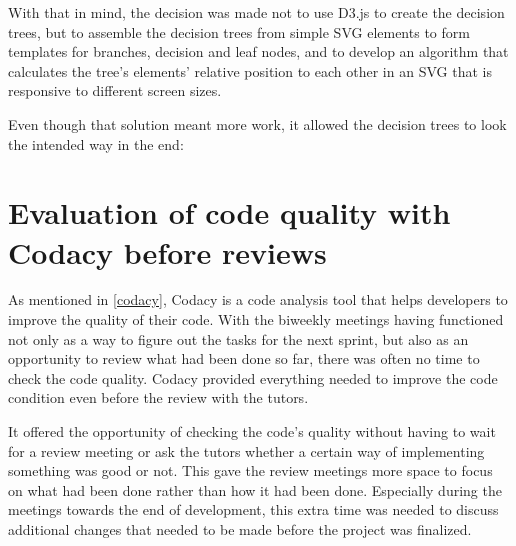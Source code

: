 With that in mind, the decision was made not to use D3.js to create the decision trees, but to assemble the decision trees from simple SVG elements to form templates for branches, decision and leaf nodes, and to develop an algorithm that calculates the tree's elements' relative position to each other in an SVG that is responsive to different screen sizes.

Even though that solution meant more work, it allowed the decision trees to look the intended way in the end:

\section{Evaluation of code quality with Codacy before reviews}
As mentioned in \ref{codacy}, Codacy is a code analysis tool that helps developers to improve the quality of their code. With the biweekly meetings having functioned not only as a way to figure out the tasks for the next sprint, but also as an opportunity to review what had been done so far, there was often no time to check the code quality. Codacy provided everything needed to improve the code condition even before the review with the tutors.

It offered the opportunity of checking the code's quality without having to wait for a review meeting or ask the tutors whether a certain way of implementing something was good or not.
This gave the review meetings more space to focus on what had been done rather than how it had been done. Especially during the meetings towards the end of development, this extra time was needed to discuss additional changes that needed to be made before the project was finalized.